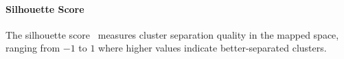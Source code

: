 \paragraph{Silhouette Score}
The silhouette score~\cite{rousseeuw1987silhouette} measures cluster separation quality in the mapped space, ranging from $-1$ to $1$ where higher values indicate better-separated clusters.

